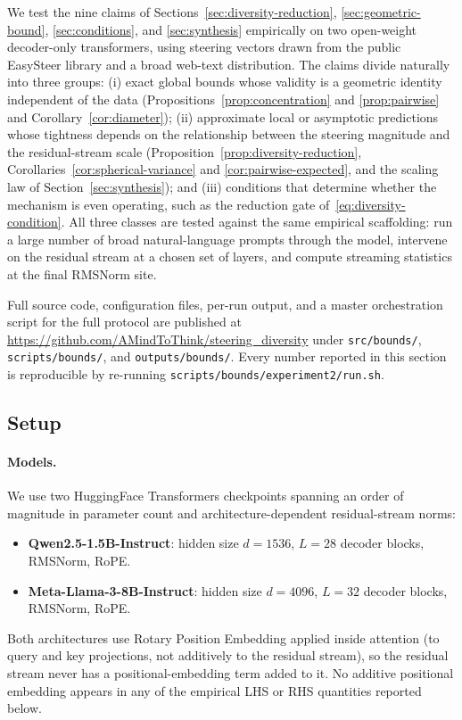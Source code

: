 We test the nine claims of Sections~\ref{sec:diversity-reduction}, \ref{sec:geometric-bound}, \ref{sec:conditions}, and \ref{sec:synthesis} empirically on two open-weight decoder-only transformers, using steering vectors drawn from the public EasySteer library and a broad web-text distribution. The claims divide naturally into three groups: (i) exact global bounds whose validity is a geometric identity independent of the data (Propositions~\ref{prop:concentration} and \ref{prop:pairwise} and Corollary~\ref{cor:diameter}); (ii) approximate local or asymptotic predictions whose tightness depends on the relationship between the steering magnitude and the residual-stream scale (Proposition~\ref{prop:diversity-reduction}, Corollaries~\ref{cor:spherical-variance} and \ref{cor:pairwise-expected}, and the scaling law of Section~\ref{sec:synthesis}); and (iii) conditions that determine whether the mechanism is even operating, such as the reduction gate of~\eqref{eq:diversity-condition}. All three classes are tested against the same empirical scaffolding: run a large number of broad natural-language prompts through the model, intervene on the residual stream at a chosen set of layers, and compute streaming statistics at the final RMSNorm site.

Full source code, configuration files, per-run output, and a master orchestration script for the full protocol are published at
\url{https://github.com/AMindToThink/steering_diversity}
under \texttt{src/bounds/}, \texttt{scripts/bounds/}, and \texttt{outputs/bounds/}. Every number reported in this section is reproducible by re-running \texttt{scripts/bounds/experiment2/run.sh}.

\subsection{Setup}
\label{sec:empirical-setup}

\paragraph{Models.} We use two HuggingFace Transformers checkpoints spanning an order of magnitude in parameter count and architecture-dependent residual-stream norms:
\begin{itemize}
  \item \textbf{Qwen2.5-1.5B-Instruct}: hidden size $d = 1536$, $L = 28$ decoder blocks, RMSNorm, RoPE.
  \item \textbf{Meta-Llama-3-8B-Instruct}: hidden size $d = 4096$, $L = 32$ decoder blocks, RMSNorm, RoPE.
\end{itemize}
Both architectures use Rotary Position Embedding applied inside attention (to query and key projections, not additively to the residual stream), so the residual stream never has a positional-embedding term added to it. No additive positional embedding appears in any of the empirical LHS or RHS quantities reported below.

